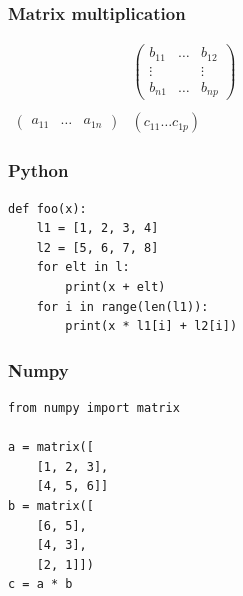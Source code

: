 \begin{frame}
  \frametitle{Matrix multiplication}
  $
  \begin{array}{cc}
      &
      \left(
        \begin{matrix}
          b_{11} & \ldots & b_{12} \\
          \vdots & & \vdots \\
          b_{n1} & \ldots & b_{np}
        \end{matrix}
      \right) \\
    &\\
    \left(
      \begin{matrix}
        a_{11} & \ldots & a_{1n}
      \end{matrix}
    \right) & \left( {c_{11} \ldots c_{1p}} \right)
  \end{array}
  $
\end{frame}

\begin{frame}[fragile]
  \frametitle{Python}
  \begin{block}{}
    \begin{lstlisting}
def foo(x):
    l1 = [1, 2, 3, 4]
    l2 = [5, 6, 7, 8]
    for elt in l:
        print(x + elt)
    for i in range(len(l1)):
        print(x * l1[i] + l2[i])
    \end{lstlisting}
  \end{block}
\end{frame}

\begin{frame}[fragile]
  \frametitle{Numpy}
  \begin{block}{}
    \begin{lstlisting}
from numpy import matrix

a = matrix([
    [1, 2, 3],
    [4, 5, 6]]
b = matrix([
    [6, 5],
    [4, 3],
    [2, 1]])
c = a * b
    \end{lstlisting}
  \end{block}
\end{frame}
